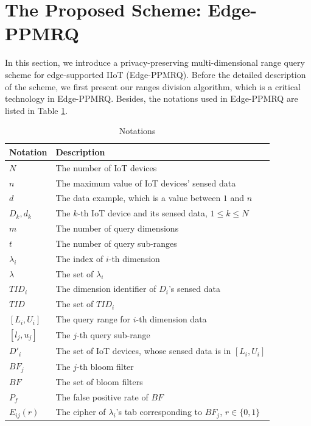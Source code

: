 \documentclass[IEEE JOURNAL OF BIOMEDICAL AND HEALTH INFORMATICS]{IEEEtran}
\begin{document}
\section{The Proposed Scheme: Edge-PPMRQ}
In this section, we introduce a privacy-preserving multi-dimensional range query scheme for edge-supported IIoT (Edge-PPMRQ). Before the detailed description of the scheme, we first present our ranges division algorithm, which is a critical technology in Edge-PPMRQ. Besides, the notations used in Edge-PPMRQ are listed in Table \ref{Notations}.

\begin{table}[h]
	\centering\caption{Notations}
	\label{Notations}
	\begin{tabular}{ll} %
		\hline
		Notation           & Description\\
		\hline
		$N$                & The number of IoT devices\\
		$n$                & The maximum value of IoT devices' sensed data \\
		$d$                & The data example, which is a value between $1$ and $n$\\
		$D_k, d_k$         & The $k$-th IoT device and its sensed data, $1 \le k \le N$ \\
		$m$                & The number of query dimensions  \\
		$t$                & The number of query sub-ranges  \\
		$\lambda_i$        & The index of $i$-th dimension\\
		$\lambda$          & The set of $\lambda_i$\\
		$TID_i$            & The dimension identifier of $D_i$'s sensed data\\
		$TID$              & The set of $TID_i$\\
		$[L_i, U_i]$       & The query range for $i$-th dimension data\\
		$[l_j, u_j]$       & The $j$-th query sub-range \\
		$D'_i$             & The set of IoT devices, whose sensed data is in $[L_i, U_i]$\\
		$BF_j$  		   & The $j$-th bloom filter \\
		$BF$               & The set of bloom filters\\
		$P_f$              & The false positive rate of $BF$\\
		$E_{ij}(r)$        & The cipher of $\lambda_i$'s tab corresponding to $BF_j$, $r\in\{0, 1\}$\\

\end{tabular}
\end{table}
\end{document}

